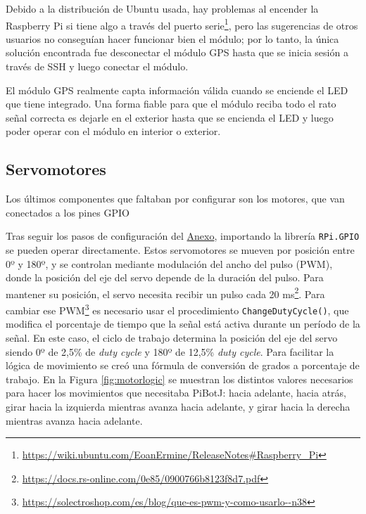 Debido a la distribución de Ubuntu usada, hay problemas al encender la Raspberry Pi si tiene algo a través del puerto serie\footnote{\url{https://wiki.ubuntu.com/EoanErmine/ReleaseNotes\#Raspberry_Pi}}, pero las sugerencias de otros usuarios no conseguían hacer funcionar bien el módulo; por lo tanto, la única solución encontrada fue desconectar el módulo \acs{GPS} hasta que se inicia sesión a través de SSH y luego conectar el módulo.

El módulo GPS realmente capta información válida cuando se enciende el LED que tiene integrado. Una forma fiable para que el módulo reciba todo el rato señal correcta es dejarle en el exterior hasta que se encienda el LED y luego poder operar con el módulo en interior o exterior. 


\subsection{Servomotores}
\label{subsec:configmotores}

Los últimos componentes que faltaban por configurar son los motores, que van conectados a los pines GPIO 


Tras seguir los pasos de configuración del \hyperref[cap:capitulo9]{Anexo}, importando la librería \verb|RPi.GPIO| se pueden operar directamente. Estos servomotores se mueven por posición entre 0º y 180º, y se controlan mediante modulación del ancho del pulso (\ac{PWM}), donde la posición del eje del servo depende de la duración del pulso. Para mantener su posición, el servo necesita recibir un pulso cada 20 ms\footnote{\url{https://docs.rs-online.com/0e85/0900766b8123f8d7.pdf}}. Para cambiar ese \ac{PWM}\footnote{\url{https://solectroshop.com/es/blog/que-es-pwm-y-como-usarlo--n38}} es necesario usar el procedimiento \verb|ChangeDutyCycle()|, que modifica el porcentaje de tiempo que la señal está activa durante un período de la señal. En este caso, el ciclo de trabajo determina la posición del eje del servo siendo 0º de 2,5\% de \textit{duty cycle} y 180º de 12,5\% \textit{duty cycle}. Para facilitar la lógica de movimiento se creó una fórmula de conversión de grados a porcentaje de trabajo. En la Figura \ref{fig:motorlogic} se muestran los distintos valores necesarios para hacer los movimientos que necesitaba PiBotJ: hacia adelante, hacia atrás, girar hacia la izquierda mientras avanza hacia adelante, y girar hacia la derecha mientras avanza hacia adelante.

